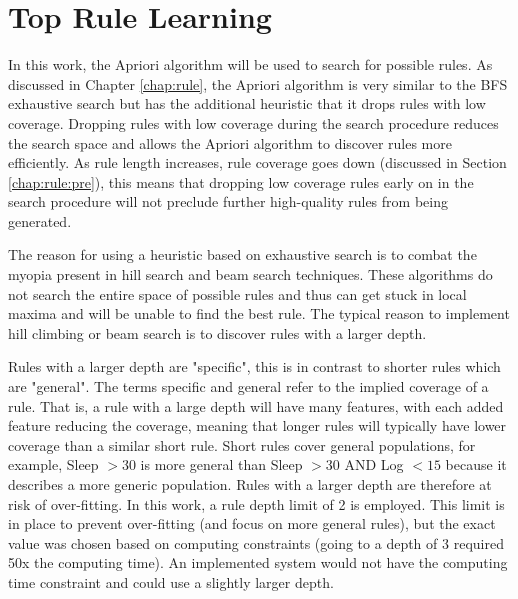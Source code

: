 




\section{Top Rule Learning}\label{chap:algo:whypriori}

In this work, the Apriori algorithm will be used to search for possible rules. As discussed in Chapter \ref{chap:rule}, the Apriori algorithm is very similar to the BFS exhaustive search but has the additional heuristic that it drops rules with low coverage. Dropping rules with low coverage during the search procedure reduces the search space and allows the Apriori algorithm to discover rules more efficiently. As rule length increases, rule coverage goes down (discussed in Section \ref{chap:rule:pre}), this means that dropping low coverage rules early on in the search procedure will not preclude further high-quality rules from being generated. 

The reason for using a heuristic based on exhaustive search is to combat the myopia present in hill search and beam search techniques. These algorithms do not search the entire space of possible rules and thus can get stuck in local maxima and will be unable to find the best rule. The typical reason to implement hill climbing or beam search is to discover rules with a larger depth.

Rules with a larger depth are "specific", this is in contrast to shorter rules which are "general". The terms specific and general refer to the implied coverage of a rule. That is, a rule with a large depth will have many features, with each added feature reducing the coverage, meaning that longer rules will typically have lower coverage than a similar short rule. Short rules cover general populations, for example, Sleep $>30$ is more general than Sleep $> 30$ AND Log $< 15$ because it describes a more generic population. Rules with a larger depth are therefore at risk of over-fitting. In this work, a rule depth limit of 2 is employed. This limit is in place to prevent over-fitting (and focus on more general rules), but the exact value was chosen based on computing constraints (going to a depth of 3 required 50x the computing time). An implemented system would not have the computing time constraint and could use a slightly larger depth.

